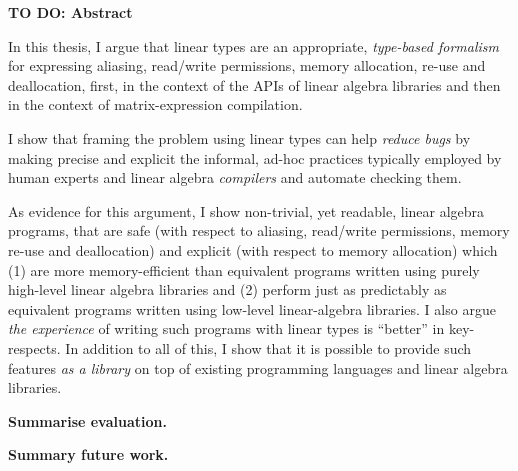 \newpage
{\normalfont\Huge\sffamily\bfseries TO DO: Abstract}
\vspace{24pt}

In this thesis, I argue that linear types are an appropriate, \emph{type-based
formalism} for expressing aliasing, read/write permissions, memory allocation,
re-use and deallocation, first, in the context of the APIs of linear algebra
libraries and then in the context of matrix-expression compilation.

I show that framing the problem using linear types can help \emph{reduce bugs}
by making precise and explicit the informal, ad-hoc practices typically
employed by human experts and linear algebra \emph{compilers} and automate
checking them.

As evidence for this argument, I show non-trivial, yet readable, linear algebra
programs, that are safe (with respect to aliasing, read/write permissions,
memory re-use and deallocation) and explicit (with respect to memory
allocation) which (1) are more memory-efficient than equivalent programs
written using purely high-level linear algebra libraries and (2) perform just
as predictably as equivalent programs written using low-level linear-algebra
libraries. I also argue \emph{the experience} of writing such programs with
linear types is ``better'' in key-respects. In addition to all of this, I show
that it is possible to provide such features \emph{as a library} on top of
existing programming languages and linear algebra libraries.

\textbf{Summarise evaluation.}

\textbf{Summary future work.}

\newpage
\vspace*{\fill}
